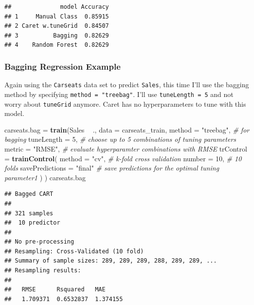 \documentclass[]{book}
\newenvironment{Shaded}{\begin{snugshade}}{\end{snugshade}}
\newcommand{\CommentTok}[1]{\textcolor[rgb]{0.56,0.35,0.01}{\textit{#1}}}
\newcommand{\DataTypeTok}[1]{\textcolor[rgb]{0.13,0.29,0.53}{#1}}
\newcommand{\DecValTok}[1]{\textcolor[rgb]{0.00,0.00,0.81}{#1}}
\newcommand{\KeywordTok}[1]{\textcolor[rgb]{0.13,0.29,0.53}{\textbf{#1}}}
\newcommand{\NormalTok}[1]{#1}
\newcommand{\OperatorTok}[1]{\textcolor[rgb]{0.81,0.36,0.00}{\textbf{#1}}}
\newcommand{\StringTok}[1]{\textcolor[rgb]{0.31,0.60,0.02}{#1}}
\begin{document}
\begin{verbatim}
##              model Accuracy
## 1     Manual Class  0.85915
## 2 Caret w.tuneGrid  0.84507
## 3          Bagging  0.82629
## 4    Random Forest  0.82629
\end{verbatim}

\hypertarget{bagging-regression-example}{%
\subsubsection{Bagging Regression Example}\label{bagging-regression-example}}

Again using the \texttt{Carseats} data set to predict \texttt{Sales}, this time I'll use the bagging method by specifying \texttt{method\ =\ "treebag"}. I'll use \texttt{tuneLength\ =\ 5} and not worry about \texttt{tuneGrid} anymore. Caret has no hyperparameters to tune with this model.

\begin{Shaded}
\begin{Highlighting}[]
\NormalTok{carseats.bag =}\StringTok{ }\KeywordTok{train}\NormalTok{(Sales }\OperatorTok{~}\StringTok{ }\NormalTok{., }
               \DataTypeTok{data =}\NormalTok{ carseats_train, }
               \DataTypeTok{method =} \StringTok{"treebag"}\NormalTok{,  }\CommentTok{# for bagging}
               \DataTypeTok{tuneLength =} \DecValTok{5}\NormalTok{,  }\CommentTok{# choose up to 5 combinations of tuning parameters}
               \DataTypeTok{metric =} \StringTok{"RMSE"}\NormalTok{,  }\CommentTok{# evaluate hyperparamter combinations with RMSE}
               \DataTypeTok{trControl =} \KeywordTok{trainControl}\NormalTok{(}
                 \DataTypeTok{method =} \StringTok{"cv"}\NormalTok{,  }\CommentTok{# k-fold cross validation}
                 \DataTypeTok{number =} \DecValTok{10}\NormalTok{,  }\CommentTok{# 10 folds}
                 \DataTypeTok{savePredictions =} \StringTok{"final"}       \CommentTok{# save predictions for the optimal tuning parameter1}
\NormalTok{                 )}
\NormalTok{               )}
\NormalTok{carseats.bag}
\end{Highlighting}
\end{Shaded}

\begin{verbatim}
## Bagged CART 
## 
## 321 samples
##  10 predictor
## 
## No pre-processing
## Resampling: Cross-Validated (10 fold) 
## Summary of sample sizes: 289, 289, 289, 288, 289, 289, ... 
## Resampling results:
## 
##   RMSE      Rsquared   MAE     
##   1.709371  0.6532837  1.374155
\end{verbatim}
\end{document}
